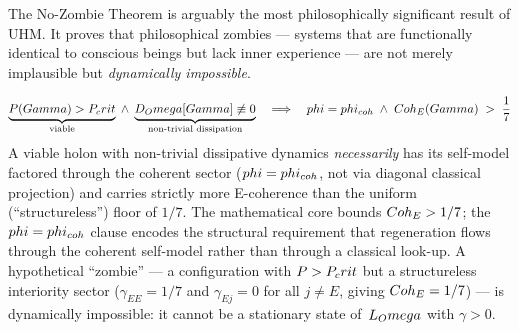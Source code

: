 The No-Zombie Theorem is arguably the most philosophically significant result of UHM.
It proves that philosophical zombies --- systems that are functionally identical to
conscious beings but lack inner experience --- are not merely implausible but
\emph{dynamically impossible}.

\begin{theorembox}
\begin{equation}
  \underbrace{P(Gamma) > P_crit}_{\text{viable}}
  \;\wedge\;
  \underbrace{D_Omega[Gamma] \not\equiv 0}_{\text{non-trivial dissipation}}
  \quad\Longrightarrow\quad
  phi = phi_{coh}
  \;\wedge\;
  Coh_E(Gamma) \;>\; \frac{1}{7}
  \label{eq:no-zombie}
\end{equation}
A viable holon with non-trivial dissipative dynamics \emph{necessarily} has
its self-model factored through the coherent sector
($phi = phi_{coh}$, not via diagonal classical projection) and
carries strictly more E-coherence than the uniform (``structureless'') floor
of $1/7$. The mathematical core bounds $Coh_E > 1/7$; the
$phi = phi_{coh}$ clause encodes the structural requirement that
regeneration flows through the coherent self-model rather than through a
classical look-up. A hypothetical ``zombie'' --- a configuration with
$P > P_crit$ but a structureless interiority sector
($\gamma_{EE} = 1/7$ and $\gamma_{Ej} = 0$ for all $j \neq E$, giving
$Coh_E = 1/7$) --- is dynamically impossible: it cannot be a stationary
state of~$L_Omega$ with $\gamma > 0$.
\end{theorembox}

